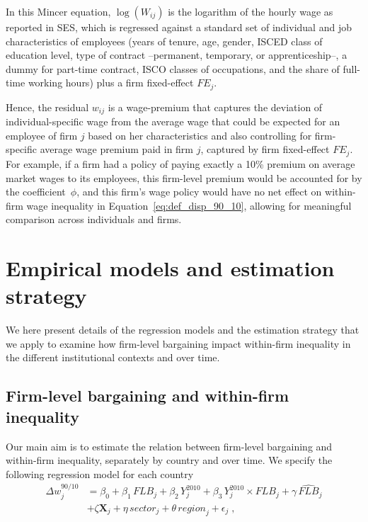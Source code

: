 \documentclass[12pt]{article}
\begin{document}
In this Mincer equation, $\log \left(W_{ij} \right)$ is the logarithm of the hourly wage as reported in SES, which is regressed against a standard set of individual and job characteristics of employees (years of tenure, age, gender, ISCED class of education level, type of contract --permanent, temporary, or apprenticeship--, a dummy for part-time contract, ISCO classes of occupations, and the share of full-time working hours) plus a firm fixed-effect $\mathit{FE}_j$. 

Hence, the residual $w_{ij}$ is a wage-premium that captures the deviation of individual-specific wage from the average wage that could be expected for an employee of firm $j$ based on her characteristics and also controlling for firm-specific average wage premium paid in firm $j$, captured by firm fixed-effect $\mathit{FE}_j$. For example, if a firm had a policy of paying exactly a 10\% premium on average market wages to its employees, this firm-level premium would be accounted for by the coefficient~$\phi$, and this firm's wage policy would have no net effect on within-firm wage inequality in Equation~\eqref{eq:def_disp_90_10}, allowing for meaningful comparison across individuals and firms. 


\section{Empirical models and estimation strategy}
\label{sec:empirical}
We here present details of the regression models and the estimation strategy that we apply to examine how firm-level bargaining impact within-firm inequality in the different institutional contexts and over time.

\subsection{Firm-level bargaining and within-firm inequality}
Our main aim is to estimate the relation between firm-level bargaining and within-firm inequality, separately by country and over time. We specify the following regression model for each country
\begin{equation}
\label{eq:reg_dispersion}
\begin{split}
  \Delta w^{90/10}_j &= \beta_0 + \beta_1\, \mathit{FLB}_j + \beta_2\, \mathit{Y}^{2010}_j + \beta_3\, \mathit{Y}^{2010}_j \times \mathit{FLB}_j + \gamma\, \widehat{\mathit{FLB}}_j \\
                     &+ \zeta\bm{X}_j + \eta\, \mathit{sector}_j + \theta\, \mathit{region}_j + \epsilon_j \;,
 \end{split}
\end{equation}
\end{document}
